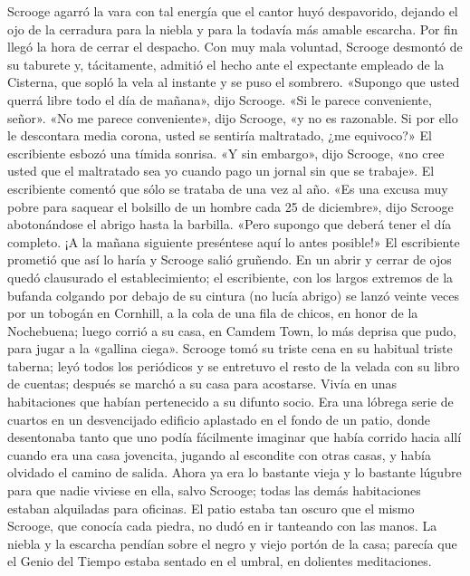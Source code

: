 \documentclass{novela}
\begin{document}
 Scrooge agarró la vara con tal energía que el cantor huyó despavorido, dejando el ojo de la cerradura para la niebla y para la todavía más amable escarcha.
 Por fin llegó la hora de cerrar el despacho. Con muy mala voluntad, Scrooge desmontó de su taburete y, tácitamente, admitió el hecho ante el expectante empleado de la Cisterna, que sopló la vela al instante y se puso el sombrero.
 «Supongo que usted querrá libre todo el día de mañana», dijo Scrooge.
 «Si le parece conveniente, señor».
 «No me parece conveniente», dijo Scrooge, «y no es razonable. Si por ello le descontara media corona, usted se sentiría maltratado, ¿me equivoco?»
 El escribiente esbozó una tímida sonrisa.
 «Y sin embargo», dijo Scrooge, «no cree usted que el maltratado sea yo cuando pago un jornal sin que se trabaje».
 El escribiente comentó que sólo se trataba de una vez al año.
 «Es una excusa muy pobre para saquear el bolsillo de un hombre cada 25 de diciembre», dijo Scrooge abotonándose el abrigo hasta la barbilla. «Pero supongo que deberá tener el día completo. ¡A la mañana siguiente preséntese aquí lo antes posible!»
 El escribiente prometió que así lo haría y Scrooge salió gruñendo. En un abrir y cerrar de ojos quedó clausurado el establecimiento; el escribiente, con los largos extremos de la bufanda colgando por debajo de su cintura (no lucía abrigo) se lanzó veinte veces por un tobogán en Cornhill, a la cola de una fila de chicos, en honor de la Nochebuena; luego corrió a su casa, en Camdem Town, lo más deprisa que pudo, para jugar a la «gallina ciega».
 Scrooge tomó su triste cena en su habitual triste taberna; leyó todos los periódicos y se entretuvo el resto de la velada con su libro de cuentas; después se marchó a su casa para acostarse. Vivía en unas habitaciones que habían pertenecido a su difunto socio. Era una lóbrega serie de cuartos en un desvencijado edificio aplastado en el fondo de un patio, donde desentonaba tanto que uno podía fácilmente imaginar que había corrido hacia allí cuando era una casa jovencita, jugando al escondite con otras casas, y había olvidado el camino de salida. Ahora ya era lo bastante vieja y lo bastante lúgubre para que nadie viviese en ella, salvo Scrooge; todas las demás habitaciones estaban alquiladas para oficinas. El patio estaba tan oscuro que el mismo Scrooge, que conocía cada piedra, no dudó en ir tanteando con las manos. La niebla y la escarcha pendían sobre el negro y viejo portón de la casa; parecía que el Genio del Tiempo estaba sentado en el umbral, en dolientes meditaciones.
\end{document}
